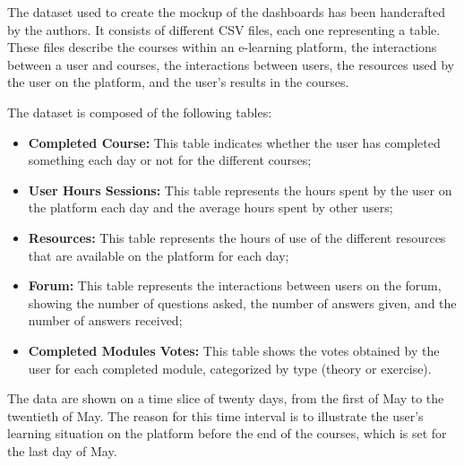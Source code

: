 The dataset used to create the mockup of the dashboards has been handcrafted by the authors.
It consists of different CSV files, each one representing a table. These files describe
the courses within an e-learning platform, the interactions between a user and courses,
the interactions between users, the resources used by the user on the platform, and the user's
results in the courses.

The dataset is composed of the following tables:
\begin{itemize}
    \item 
        \textbf{Completed Course:} This table indicates whether the user has completed something each 
        day or not for the different courses;
    \item 
        \textbf{User Hours Sessions:} This table represents the hours spent by the user on the platform 
        each day and the average hours spent by other users;
    \item 
        \textbf{Resources:} This table represents the hours of use of the different resources that are
        available on the platform for each day;
    \item 
        \textbf{Forum:} This table represents the interactions between users on the forum, showing the number
        of questions asked, the number of answers given, and the number of answers received;
    \item 
        \textbf{Completed Modules Votes:} This table shows the votes obtained by the user for each completed module, 
        categorized by type (theory or exercise).
\end{itemize}

The data are shown on a time slice of twenty days, from the first of May to the twentieth of May. The reason for 
this time interval is to illustrate the user's learning situation on the platform before the end of the courses,
which is set for the last day of May. 

